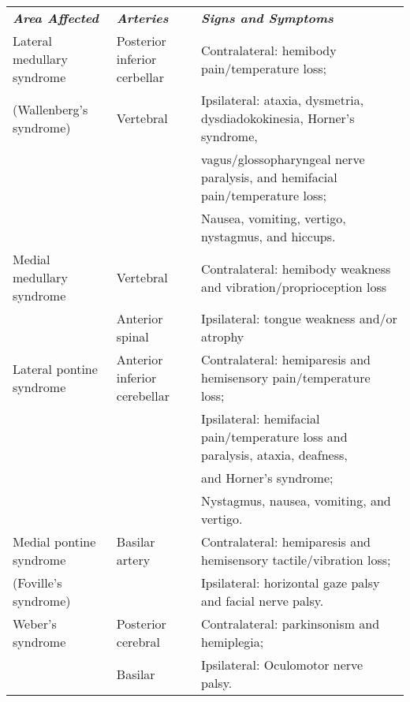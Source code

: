 \begin{landscape}
\begin{table}
\begin{tabular}{l | l | l}
\toprule
\noalign{\smallskip}
\textbf{\emph{Area Affected}} & \textbf{\emph{Arteries}} & \textbf{\emph{Signs and Symptoms}}\\ 
\noalign{\smallskip}
\toprule
\noalign{\smallskip}
Lateral medullary syndrome & Posterior inferior cerbellar & Contralateral: hemibody pain/temperature loss;\\
(Wallenberg's syndrome) & Vertebral & Ipsilateral: ataxia, dysmetria, dysdiadokokinesia, Horner's syndrome,\\
& & vagus/glossopharyngeal nerve paralysis, and hemifacial pain/temperature loss;\\
& & Nausea, vomiting, vertigo, nystagmus, and hiccups.\\
\noalign{\smallskip}
\hline
\noalign{\smallskip}
Medial medullary syndrome & Vertebral & Contralateral: hemibody weakness and vibration/proprioception loss\\
& Anterior spinal & Ipsilateral: tongue weakness and/or atrophy \\
\noalign{\smallskip}
\hline
\noalign{\smallskip}
Lateral pontine syndrome & Anterior inferior cerebellar & Contralateral: hemiparesis and hemisensory pain/temperature loss; \\
& & Ipsilateral: hemifacial pain/temperature loss and paralysis, ataxia, deafness,\\
& & and Horner's syndrome;\\
& & Nystagmus, nausea, vomiting, and vertigo.\\
\noalign{\smallskip}
\hline
\noalign{\smallskip}
Medial pontine syndrome & Basilar artery & Contralateral: hemiparesis and hemisensory tactile/vibration loss;\\
(Foville's syndrome) & & Ipsilateral: horizontal gaze palsy and facial nerve palsy. \\
\noalign{\smallskip}
\hline
\noalign{\smallskip}
Weber's syndrome & Posterior cerebral & Contralateral: parkinsonism and hemiplegia;\\
& Basilar & Ipsilateral: Oculomotor nerve palsy.\\

\end{tabular}
\end{table}
\end{landscape}
